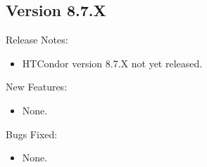 \subsection*{\label{sec:New-8-7-X}Version 8.7.X}

\noindent Release Notes:

\begin{itemize}

\item HTCondor version 8.7.X not yet released.

\end{itemize}


\noindent New Features:

\begin{itemize}

\item None.

\end{itemize}

\noindent Bugs Fixed:

\begin{itemize}

\item None.

\end{itemize}

